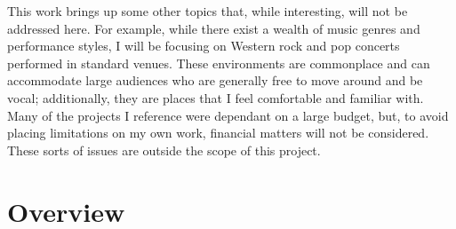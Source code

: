 This work brings up some other topics that, while interesting, will not be addressed here. For example, while there exist a wealth of music genres and performance styles, I will be focusing on Western rock and pop concerts performed in standard venues. These environments are commonplace and can accommodate large audiences who are generally free to move around and be vocal; additionally, they are places that I feel comfortable and familiar with. Many of the projects I reference were dependant on a large budget, but, to avoid placing limitations on my own work, financial matters will not be considered. These sorts of issues are outside the scope of this project.


\section{Overview}

